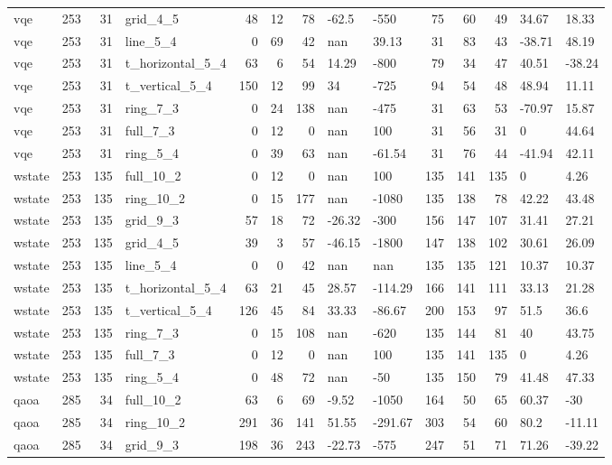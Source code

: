 \begin{longtable}{lrrlrrrllrrrll}
vqe & 253 & 31 & grid\_4\_5 & 48 & 12 & 78 & -62.5 & -550 & 75 & 60 & 49 & 34.67 & 18.33 \\
vqe & 253 & 31 & line\_5\_4 & 0 & 69 & 42 & nan & 39.13 & 31 & 83 & 43 & -38.71 & 48.19 \\
vqe & 253 & 31 & t\_horizontal\_5\_4 & 63 & 6 & 54 & 14.29 & -800 & 79 & 34 & 47 & 40.51 & -38.24 \\
vqe & 253 & 31 & t\_vertical\_5\_4 & 150 & 12 & 99 & 34 & -725 & 94 & 54 & 48 & 48.94 & 11.11 \\
vqe & 253 & 31 & ring\_7\_3 & 0 & 24 & 138 & nan & -475 & 31 & 63 & 53 & -70.97 & 15.87 \\
vqe & 253 & 31 & full\_7\_3 & 0 & 12 & 0 & nan & 100 & 31 & 56 & 31 & 0 & 44.64 \\
vqe & 253 & 31 & ring\_5\_4 & 0 & 39 & 63 & nan & -61.54 & 31 & 76 & 44 & -41.94 & 42.11 \\
wstate & 253 & 135 & full\_10\_2 & 0 & 12 & 0 & nan & 100 & 135 & 141 & 135 & 0 & 4.26 \\
wstate & 253 & 135 & ring\_10\_2 & 0 & 15 & 177 & nan & -1080 & 135 & 138 & 78 & 42.22 & 43.48 \\
wstate & 253 & 135 & grid\_9\_3 & 57 & 18 & 72 & -26.32 & -300 & 156 & 147 & 107 & 31.41 & 27.21 \\
wstate & 253 & 135 & grid\_4\_5 & 39 & 3 & 57 & -46.15 & -1800 & 147 & 138 & 102 & 30.61 & 26.09 \\
wstate & 253 & 135 & line\_5\_4 & 0 & 0 & 42 & nan & nan & 135 & 135 & 121 & 10.37 & 10.37 \\
wstate & 253 & 135 & t\_horizontal\_5\_4 & 63 & 21 & 45 & 28.57 & -114.29 & 166 & 141 & 111 & 33.13 & 21.28 \\
wstate & 253 & 135 & t\_vertical\_5\_4 & 126 & 45 & 84 & 33.33 & -86.67 & 200 & 153 & 97 & 51.5 & 36.6 \\
wstate & 253 & 135 & ring\_7\_3 & 0 & 15 & 108 & nan & -620 & 135 & 144 & 81 & 40 & 43.75 \\
wstate & 253 & 135 & full\_7\_3 & 0 & 12 & 0 & nan & 100 & 135 & 141 & 135 & 0 & 4.26 \\
wstate & 253 & 135 & ring\_5\_4 & 0 & 48 & 72 & nan & -50 & 135 & 150 & 79 & 41.48 & 47.33 \\
qaoa & 285 & 34 & full\_10\_2 & 63 & 6 & 69 & -9.52 & -1050 & 164 & 50 & 65 & 60.37 & -30 \\
qaoa & 285 & 34 & ring\_10\_2 & 291 & 36 & 141 & 51.55 & -291.67 & 303 & 54 & 60 & 80.2 & -11.11 \\
qaoa & 285 & 34 & grid\_9\_3 & 198 & 36 & 243 & -22.73 & -575 & 247 & 51 & 71 & 71.26 & -39.22 \\

\end{longtable}
